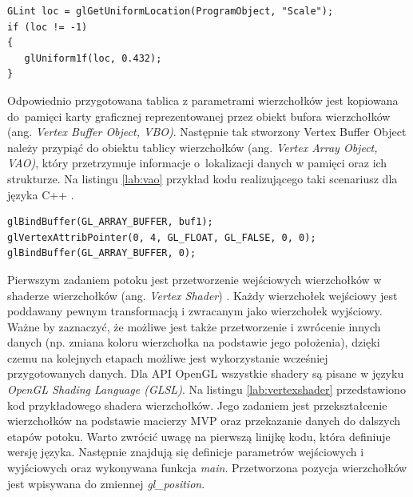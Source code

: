 \documentclass[archive]{mgr}
\begin{document}
\begin{lstlisting}[caption={Ustawianie wartości uniformu w języku C++},captionpos=b,label={lab:uniform}]
GLint loc = glGetUniformLocation(ProgramObject, "Scale");
if (loc != -1)
{
   glUniform1f(loc, 0.432);
}
\end{lstlisting}

Odpowiednio przygotowana tablica z parametrami wierzchołków jest kopiowana do~pamięci karty graficznej reprezentowanej przez obiekt bufora wierzchołków (ang. \emph{Vertex Buffer Object, VBO)}. Następnie tak stworzony Vertex Buffer Object należy przypiąć do obiektu tablicy wierzchołków (ang. \emph{Vertex Array Object, VAO)}, który przetrzymuje informacje o~lokalizacji danych w pamięci oraz ich strukturze. Na listingu \ref{lab:vao} przykład kodu realizującego taki scenariusz dla języka C++ \cite{VertexSpecification}.\\


\begin{lstlisting}[caption={Definiowanie właściowści VAO},captionpos=b,label={lab:vao}]
glBindBuffer(GL_ARRAY_BUFFER, buf1);
glVertexAttribPointer(0, 4, GL_FLOAT, GL_FALSE, 0, 0);
glBindBuffer(GL_ARRAY_BUFFER, 0);
\end{lstlisting}


Pierwszym zadaniem potoku jest przetworzenie wejściowych wierzchołków w shaderze wierzchołków (ang. \emph{Vertex Shader}) \cite{OpenGLVertexShader}. Każdy wierzchołek wejściowy jest poddawany pewnym transformacją i zwracanym jako wierzchołek wyjściowy. Ważne by zaznaczyć, że możliwe jest także przetworzenie i zwrócenie innych danych (np. zmiana koloru wierzchołka na podstawie jego położenia), dzięki czemu na kolejnych etapach możliwe jest wykorzystanie wcześniej przygotowanych danych. Dla API OpenGL wszystkie shadery są pisane w języku \emph{OpenGL Shading Language (GLSL)}. Na listingu \ref{lab:vertexshader} przedstawiono kod przykładowego shadera wierzchołków. Jego zadaniem jest przekształcenie wierzchołków na podstawie macierzy MVP oraz przekazanie danych do dalszych etapów potoku. Warto zwrócić uwagę na pierwszą linijkę kodu, która definiuje wersję języka. Następnie znajdują się definicje parametrów wejściowych i wyjściowych oraz wykonywana funkcja \emph{main}. 
 Przetworzona pozycja wierzchołków jest wpisywana do zmiennej \emph{gl\_position}.
\end{document}
